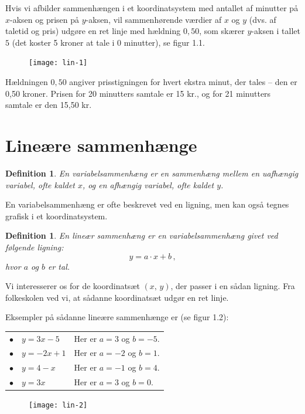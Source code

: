 \documentclass[12pt,oneside,a4paper]{article}
\newtheorem{mydef}[thm]{Definition}
\begin{document}
Hvis vi afbilder sammenhængen i et koordinatsystem med antallet af minutter på
$x$-aksen og prisen på $y$-aksen, vil sammenhørende værdier af $x$ og $y$ (dvs.
af taletid og pris) udgøre en ret linje med hældning $0,50$, som skærer
$y$-aksen i tallet $5$ (det koster 5 kroner at tale i 0 minutter), se figur
1.1.

\begin{figure}[H]
    \centering
    \texttt{[image: lin-1]}
\end{figure}

Hældningen $0,50$ angiver prisstigningen for hvert ekstra minut, der tales --
den er 0,50 kroner.  Prisen for 20 minutters samtale er 15 kr., og for 21
minutters samtale er den 15,50 kr.



\section{Lineære sammenhænge}
\begin{mydef}
    En {\em variabelsammenhæng} er en sammenhæng mellem en uafhængig variabel, ofte
    kaldet $x$, og en afhængig variabel, ofte kaldet $y$.
\end{mydef}

En variabelsammenhæng er ofte beskrevet ved en ligning, men kan også tegnes grafisk i et
koordinatsystem.

\begin{mydef}
    En {\em lineær sammenhæng} er en variabelsammenhæng givet ved følgende ligning:
    $$
    y = a\cdot x + b \,,
    $$
    hvor $a$ og $b$ er tal.
\end{mydef}

Vi interesserer os for de koordinatsæt $(x,\,y)$, der passer i en sådan ligning.
Fra folkeskolen ved vi, at sådanne koordinatsæt udgør en ret linje.

Eksempler på sådanne lineære sammenhænge er (se figur 1.2):

\begin{tabular}{ll}
    $\bullet\quad y=3x-5$  & Her er $a=3$ og $b=-5$. \\
    $\bullet\quad y=-2x+1$ & Her er $a=-2$ og $b=1$. \\
    $\bullet\quad y=4-x$   & Her er $a=-1$ og $b=4$. \\
    $\bullet\quad y=3x$    & Her er $a=3$ og $b=0$.
\end{tabular}

\begin{figure}[H]
    \centering
    \texttt{[image: lin-2]}
\end{figure}
\end{document}
